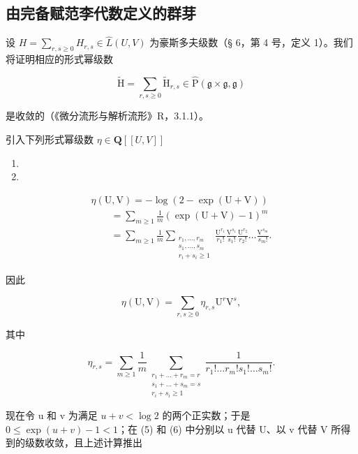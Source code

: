 \subsection{由完备赋范李代数定义的群芽}

设 \(H = \sum_{r,s \geqslant 0} H_{r,s} \in \hat{L}(U, V)\) 为豪斯多夫级数（§ 6，第 4 号，定义 1）。我们将证明相应的形式幂级数

\[
\tilde {\mathrm{H}} = \sum_ {r, s \geqslant 0} \tilde {\mathrm{H}} _ {r, s} \in \hat {\mathrm{P}} (\mathfrak {g} \times \mathfrak {g}, \mathfrak {g})\tag{3}
\]

是收敛的（《微分流形与解析流形》R，3.1.1）。

引入下列形式幂级数 \(\eta\in\mathbf{Q}[[U,V]]\)

\begin{enumerate}
\def\labelenumi{(\arabic{enumi})}
\setcounter{enumi}{3}
\tightlist
\item
\item
\end{enumerate}

\[
\begin{array}{l}\eta (\mathrm{U},\mathrm{V}) = -\log (2 - \exp (\mathrm{U} + \mathrm{V}))\\ \qquad = \sum_{m\geqslant 1}\frac{1}{m} (\exp (\mathrm{U} + \mathrm{V}) - 1)^{m}\\ \qquad = \sum_{m\geqslant 1}\frac{1}{m}\sum_{\substack{r_{1},\ldots ,r_{m}\\ s_{1},\ldots ,s_{m}\\ r_{i} + s_{i}\geqslant 1}}\frac{\mathrm{U}^{r_{1}}}{r_{1}!}\frac{\mathrm{V}^{s_{1}}}{s_{1}!}\frac{\mathrm{U}^{r_{2}}}{r_{2}!}\dots \frac{\mathrm{V}^{s_{m}}}{s_{m}!}. \end{array}\tag{6}
\]

因此

\[
\eta (\mathrm{U}, \mathrm{V}) = \sum_ {r, s \geqslant 0} \eta_ {r, s} \mathrm{U} ^ {r} \mathrm{V} ^ {s},\tag{7}
\]

其中

\[
\eta_{r,s} = \sum_{m\geqslant 1}\frac{1}{m}\sum_{\substack{r_{1} + \dots +r_{m} = r\\ s_{1} + \dots +s_{m} = s\\ r_{i} + s_{i}\geqslant 1}}\frac{1}{r_{1}!\ldots r_{m}!s_{1}!\ldots s_{m}!}.\tag{8}
\]

现在令 u 和 v 为满足 \(u + v < \log 2\) 的两个正实数；于是 \(0 \leqslant \exp(u + v) - 1 < 1\)；在 (5) 和 (6) 中分别以 u 代替 U、以 v 代替 V 所得到的级数收敛，且上述计算推出

